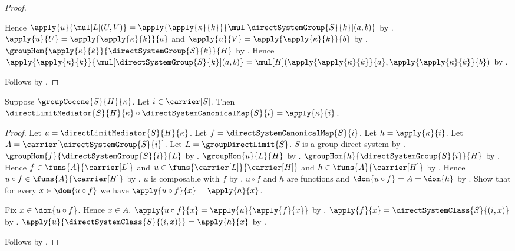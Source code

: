\begin{proof}
\begin{subproof}
        Hence $\apply{u}{\mul[L](U,V)}=
            \apply{\apply{\kappa}{k}}
                {\mul[\directSystemGroup{S}{k}](a,b)}$ by
            .
        $\apply{u}{U}=\apply{\apply{\kappa}{k}}{a}$ and
            $\apply{u}{V}=\apply{\apply{\kappa}{k}}{b}$ by
            .
        $\groupHom{\apply{\kappa}{k}}
            {\directSystemGroup{S}{k}}{H}$ by
            .
        Hence $\apply{\apply{\kappa}{k}}
                {\mul[\directSystemGroup{S}{k}](a,b)}
            =\mul[H]
                (\apply{\apply{\kappa}{k}}{a},
                 \apply{\apply{\kappa}{k}}{b})$ by
            .
    \end{subproof}
    Follows by .
\end{proof}

\begin{theorem}\label{direct_limit_mediator_factorization}
    Suppose $\groupCocone{S}{H}{\kappa}$.
    Let $i\in\carrier[S]$.
    Then
        $\directLimitMediator{S}{H}{\kappa}\circ
            \directSystemCanonicalMap{S}{i}
        =\apply{\kappa}{i}$.
\end{theorem}
\begin{proof}
    Let $u=\directLimitMediator{S}{H}{\kappa}$.
    Let $f=\directSystemCanonicalMap{S}{i}$.
    Let $h=\apply{\kappa}{i}$.
    Let $A=\carrier[\directSystemGroup{S}{i}]$.
    Let $L=\groupDirectLimit{S}$.
    $S$ is a group direct system by
        .
    $\groupHom{f}{\directSystemGroup{S}{i}}{L}$ by
        .
    $\groupHom{u}{L}{H}$ by
        .
    $\groupHom{h}{\directSystemGroup{S}{i}}{H}$ by
        .
    Hence $f\in\funs{A}{\carrier[L]}$ and
        $u\in\funs{\carrier[L]}{\carrier[H]}$ and
        $h\in\funs{A}{\carrier[H]}$ by
        .
    Hence $u\circ f\in\funs{A}{\carrier[H]}$ by
        .
    $u$ is composable with $f$ by
        .
    $u\circ f$ and $h$ are functions and
        $\dom{u\circ f}=A=\dom{h}$ by
        .
    Show that for every $x\in\dom{u\circ f}$ we have
        $\apply{u\circ f}{x}=\apply{h}{x}$.
    \begin{subproof}
        Fix $x\in\dom{u\circ f}$.
        Hence $x\in A$.
        $\apply{u\circ f}{x}=\apply{u}{\apply{f}{x}}$ by
            .
        $\apply{f}{x}=\directSystemClass{S}{(i,x)}$ by
            .
        $\apply{u}{\directSystemClass{S}{(i,x)}}=\apply{h}{x}$ by
            .
    \end{subproof}
    Follows by .
\end{proof}

